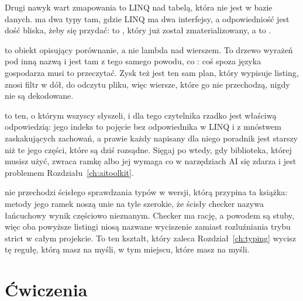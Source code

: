 Drugi nawyk wart zmapowania to LINQ nad tabelą, która nie jest w bazie
danych.  ma dwa typy tam, gdzie LINQ ma dwa interfejsy, a
odpowiedniość jest dość bliska, żeby się przydać:  to
, który już został zmaterializowany, a  to
.




\noindent
{} to obiekt opisujący porównanie, a nie lambda
nad wierszem. To drzewo wyrażeń pod inną nazwą i jest tam z tego samego
powodu, co : coś spoza języka gospodarza musi
to przeczytać. Zysk też jest ten sam \dash{} plan, który wypisuje listing,
znosi filtr w dół, do odczytu pliku, więc wiersze, które go nie przechodzą,
nigdy nie są dekodowane.


\begin{note}
 to ten, o którym wszyscy słyszeli, i dla tego czytelnika rzadko
jest właściwą odpowiedzią: jego indeks to pojęcie bez odpowiednika w LINQ i
z mnóstwem zaskakujących zachowań, a prawie każdy napisany dla niego poradnik
jest starszy niż te jego części, które są dziś rozsądne. Sięgaj po
 wtedy, gdy biblioteka, której musisz użyć, zwraca ramkę
 albo jej wymaga \dash{} co w narzędziach AI się zdarza i jest
problemem Rozdziału~\ref{ch:aitoolkit}.
\end{note}

\begin{note}
 nie przechodzi ścisłego sprawdzania typów w wersji, którą
przypina ta książka: metody jego ramek noszą unie na tyle szerokie, że
ścisły checker nazywa łańcuchowy wynik częściowo nieznanym. Checker ma
rację, a powodem są stuby, więc oba powyższe listingi niosą nazwane
wyciszenie zamiast rozluźniania trybu strict w całym projekcie. To ten
kształt, który zaleca Rozdział~\ref{ch:typing} \dash{} wycisz tę regułę,
którą masz na myśli, w tym miejscu, które masz na myśli.
\end{note}

\section*{Ćwiczenia}

